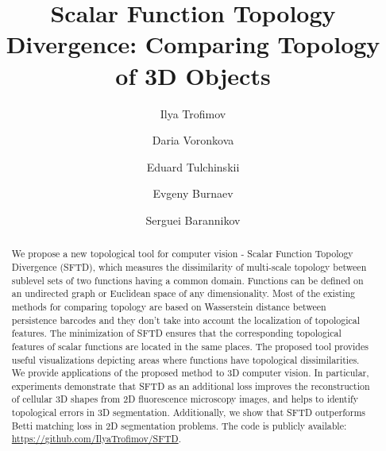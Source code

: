 \documentclass[runningheads]{llncs}
\begin{document}
\title{Scalar Function Topology Divergence: Comparing Topology of 3D Objects} 


\author{Ilya Trofimov \and
Daria Voronkova  \and
Eduard Tulchinskii \and
Evgeny Burnaev \and
Serguei Barannikov}



\maketitle

\begin{abstract}
We propose a new topological tool for computer vision - Scalar Function Topology Divergence (SFTD), which measures the dissimilarity of multi-scale topology between sublevel sets of two functions having a common domain. Functions can be defined on an undirected graph or Euclidean space of any dimensionality.
Most of the existing methods for comparing topology are based on Wasserstein distance between persistence barcodes and they don't take into account the localization of topological features.
The minimization of SFTD ensures that the corresponding topological features of scalar functions are located in the same places.
The proposed tool provides useful visualizations depicting areas where functions have topological dissimilarities.
We provide applications of the proposed method to 3D computer vision. In particular, experiments demonstrate that SFTD as an additional loss improves the reconstruction of cellular 3D shapes from 2D fluorescence microscopy images, and helps to identify topological errors in 3D segmentation. Additionally, we show that SFTD outperforms Betti matching loss in 2D segmentation problems. The code is publicly available:
\url{https://github.com/IlyaTrofimov/SFTD}.
\end{abstract}
\end{document}
